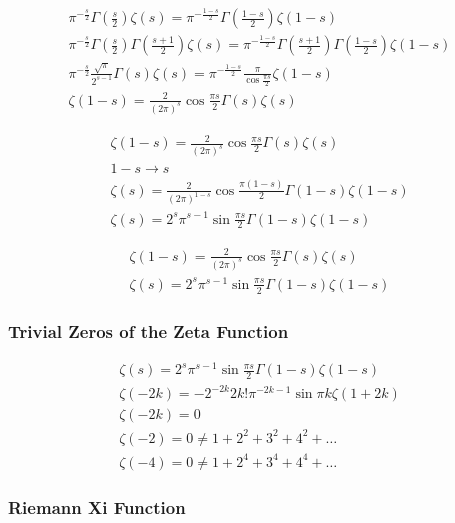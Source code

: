 	$$
	\begin{gathered}
		\pi^{-\frac{s}{2}} \Gamma\left(\frac{s}{2}\right) \zeta(s)=\pi^{-\frac{1-s}{2}} \Gamma\left(\frac{1-s}{2}\right) \zeta(1-s) \\
		\pi^{-\frac{s}{2}} \Gamma\left(\frac{s}{2}\right) \Gamma\left(\frac{s+1}{2}\right) \zeta(s)=\pi^{-\frac{1-s}{2}} \Gamma\left(\frac{s+1}{2}\right) \Gamma\left(\frac{1-s}{2}\right) \zeta(1-s) \\
		\pi^{-\frac{s}{2}} \frac{\sqrt{\pi}}{2^{s-1}} \Gamma(s) \zeta(s)=\pi^{-\frac{1-s}{2}} \frac{\pi}{\cos \frac{\pi s}{2}} \zeta(1-s) \\
		\zeta(1-s)=\frac{2}{(2 \pi)^s} \cos \frac{\pi s}{2} \Gamma(s) \zeta(s)
	\end{gathered}
	$$
	
	$$
	\begin{gathered}
		\zeta(1-s)=\frac{2}{(2 \pi)^s} \cos \frac{\pi s}{2} \Gamma(s) \zeta(s) \\
		1-s \rightarrow s \\
		\zeta(s)=\frac{2}{(2 \pi)^{1-s}} \cos \frac{\pi(1-s)}{2} \Gamma(1-s) \zeta(1-s) \\
		\zeta(s)=2^s \pi^{s-1} \sin \frac{\pi s}{2} \Gamma(1-s) \zeta(1-s)
	\end{gathered}
	$$
	
	$$
	\begin{gathered}
		\zeta(1-s)=\frac{2}{(2 \pi)^s} \cos \frac{\pi s}{2} \Gamma(s) \zeta(s) \\
		\zeta(s)=2^s \pi^{s-1} \sin \frac{\pi s}{2} \Gamma(1-s) \zeta(1-s)
	\end{gathered}
	$$
	
	\subsubsection{Trivial Zeros of the Zeta Function}
	
	$$
	\begin{gathered}
		\zeta(s)=2^s \pi^{s-1} \sin \frac{\pi s}{2} \Gamma(1-s) \zeta(1-s) \\
		\zeta(-2 k)=-2^{-2 k} 2 k ! \pi^{-2 k-1} \sin \pi k \zeta(1+2 k) \\
		\zeta(-2 k)=0 \\
		\zeta(-2)=0 \neq 1+2^2+3^2+4^2+\ldots \\
		\zeta(-4)=0 \neq 1+2^4+3^4+4^4+\ldots
	\end{gathered}
	$$
	
	\subsubsection{Riemann Xi Function}
	
